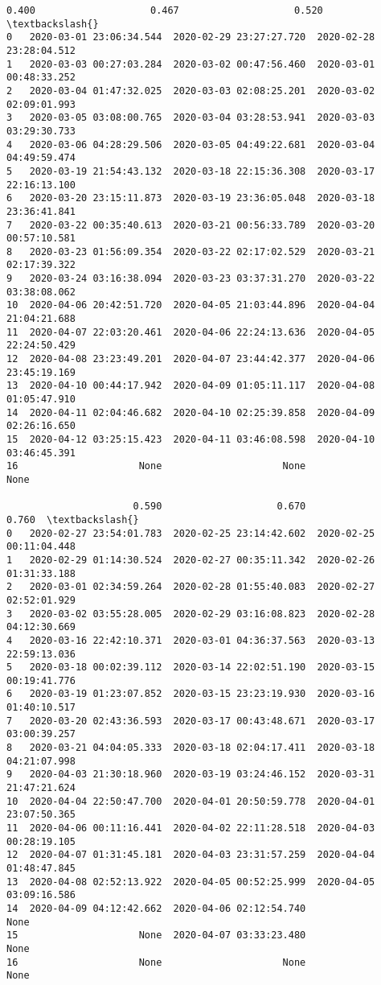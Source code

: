 \documentclass[11pt]{article}
\begin{document}
\begin{tcolorbox}[breakable, size=fbox, boxrule=.5pt, pad at break*=1mm, opacityfill=0]
\begin{Verbatim}[commandchars=\\\{\}]
                      0.400                    0.467                    0.520  \textbackslash{}
0   2020-03-01 23:06:34.544  2020-02-29 23:27:27.720  2020-02-28 23:28:04.512
1   2020-03-03 00:27:03.284  2020-03-02 00:47:56.460  2020-03-01 00:48:33.252
2   2020-03-04 01:47:32.025  2020-03-03 02:08:25.201  2020-03-02 02:09:01.993
3   2020-03-05 03:08:00.765  2020-03-04 03:28:53.941  2020-03-03 03:29:30.733
4   2020-03-06 04:28:29.506  2020-03-05 04:49:22.681  2020-03-04 04:49:59.474
5   2020-03-19 21:54:43.132  2020-03-18 22:15:36.308  2020-03-17 22:16:13.100
6   2020-03-20 23:15:11.873  2020-03-19 23:36:05.048  2020-03-18 23:36:41.841
7   2020-03-22 00:35:40.613  2020-03-21 00:56:33.789  2020-03-20 00:57:10.581
8   2020-03-23 01:56:09.354  2020-03-22 02:17:02.529  2020-03-21 02:17:39.322
9   2020-03-24 03:16:38.094  2020-03-23 03:37:31.270  2020-03-22 03:38:08.062
10  2020-04-06 20:42:51.720  2020-04-05 21:03:44.896  2020-04-04 21:04:21.688
11  2020-04-07 22:03:20.461  2020-04-06 22:24:13.636  2020-04-05 22:24:50.429
12  2020-04-08 23:23:49.201  2020-04-07 23:44:42.377  2020-04-06 23:45:19.169
13  2020-04-10 00:44:17.942  2020-04-09 01:05:11.117  2020-04-08 01:05:47.910
14  2020-04-11 02:04:46.682  2020-04-10 02:25:39.858  2020-04-09 02:26:16.650
15  2020-04-12 03:25:15.423  2020-04-11 03:46:08.598  2020-04-10 03:46:45.391
16                     None                     None                     None

                      0.590                    0.670                    0.760  \textbackslash{}
0   2020-02-27 23:54:01.783  2020-02-25 23:14:42.602  2020-02-25 00:11:04.448
1   2020-02-29 01:14:30.524  2020-02-27 00:35:11.342  2020-02-26 01:31:33.188
2   2020-03-01 02:34:59.264  2020-02-28 01:55:40.083  2020-02-27 02:52:01.929
3   2020-03-02 03:55:28.005  2020-02-29 03:16:08.823  2020-02-28 04:12:30.669
4   2020-03-16 22:42:10.371  2020-03-01 04:36:37.563  2020-03-13 22:59:13.036
5   2020-03-18 00:02:39.112  2020-03-14 22:02:51.190  2020-03-15 00:19:41.776
6   2020-03-19 01:23:07.852  2020-03-15 23:23:19.930  2020-03-16 01:40:10.517
7   2020-03-20 02:43:36.593  2020-03-17 00:43:48.671  2020-03-17 03:00:39.257
8   2020-03-21 04:04:05.333  2020-03-18 02:04:17.411  2020-03-18 04:21:07.998
9   2020-04-03 21:30:18.960  2020-03-19 03:24:46.152  2020-03-31 21:47:21.624
10  2020-04-04 22:50:47.700  2020-04-01 20:50:59.778  2020-04-01 23:07:50.365
11  2020-04-06 00:11:16.441  2020-04-02 22:11:28.518  2020-04-03 00:28:19.105
12  2020-04-07 01:31:45.181  2020-04-03 23:31:57.259  2020-04-04 01:48:47.845
13  2020-04-08 02:52:13.922  2020-04-05 00:52:25.999  2020-04-05 03:09:16.586
14  2020-04-09 04:12:42.662  2020-04-06 02:12:54.740                     None
15                     None  2020-04-07 03:33:23.480                     None
16                     None                     None                     None


\end{Verbatim}
\end{tcolorbox}
\end{document}
